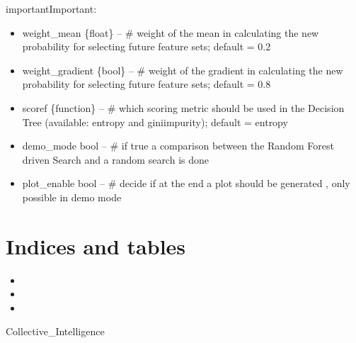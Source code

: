 \documentclass[letterpaper,10pt,english]{sphinxmanual}
\begin{document}
\begin{sphinxadmonition}{important}{Important:}
\begin{fulllineitems}
\begin{itemize}
\item {} 
weight\_mean \{float\} -- \# weight of the mean in calculating the new probability for selecting future feature sets; default = 0.2

\item {} 
weight\_gradient \{bool\} -- \# weight of the gradient in calculating the new probability for selecting future feature sets; default = 0.8

\item {} 
scoref \{function\} -- \# which scoring metric should be used in the Decision Tree (available: entropy and giniimpurity); default = entropy

\item {} 
demo\_mode bool -- \# if true a comparison between the Random Forest driven Search and a random search is done

\item {} 
plot\_enable bool -- \# decide if at the end a plot should be generated , only possible in demo mode

\end{itemize}

\end{fulllineitems}

\end{sphinxadmonition}


\chapter{Indices and tables}
\label{\detokenize{index:indices-and-tables}}\begin{itemize}
\item {} 

\item {} 

\item {} 

\end{itemize}
\label{\detokenize{index:blank}}\begin{figure}[htbp]
\centering

\noindent{}
\label{\detokenize{index:blank}}\end{figure}

\begin{sphinxthebibliography}{Collective_Intelligence}
\end{sphinxthebibliography}
\end{document}
